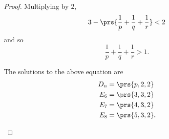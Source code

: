 \documentclass[10pt,a4paper,twoside,openany,hidelinks]{book}
\begin{document}
\begin{enumerate}
\begin{proof}
Multiplying by $2$,
\[3 - \prs{\frac{1}{p} + \frac{1}{q} + \frac{1}{r}} < 2\]
and so
\[\frac{1}{p} + \frac{1}{q} + \frac{1}{r} > 1 \text{.}\]
\begin{exercise}
The solutions to the above equation are
\begin{align*}
D_n &= \prs{p,2,2} \\
E_6 &= \prs{3,3,2} \\
E_7 &= \prs{4,3,2} \\
E_8 &= \prs{5,3,2} \text{.}
\end{align*}
\end{exercise}
\end{proof}
\end{enumerate}

\backmatter
\end{document}
